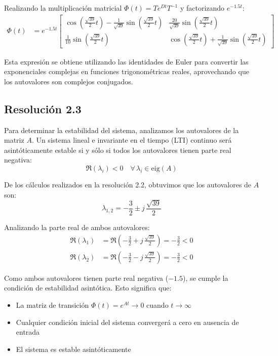 \documentclass[
  11pt,
  letterpaper,
   addpoints,
  answers
  ]{exam}
\begin{document}
\begin{solution}
Realizando la multiplicación matricial $\Phi(t) = T e^{Dt} T^{-1}$ y factorizando $e^{-1.5t}$:
\begin{align}
\Phi(t) &= e^{-1.5t} \begin{bmatrix}
\cos\left(\frac{\sqrt{39}}{2}t\right) - \frac{1}{\sqrt{39}}\sin\left(\frac{\sqrt{39}}{2}t\right) & \frac{20}{\sqrt{39}}\sin\left(\frac{\sqrt{39}}{2}t\right) \\[6pt]
\frac{1}{10}\sin\left(\frac{\sqrt{39}}{2}t\right) & \cos\left(\frac{\sqrt{39}}{2}t\right) + \frac{1}{\sqrt{39}}\sin\left(\frac{\sqrt{39}}{2}t\right)
\end{bmatrix}
\end{align}

Esta expresión se obtiene utilizando las identidades de Euler para convertir las exponenciales complejas en funciones trigonométricas reales, aprovechando que los autovalores son complejos conjugados.
\subsection*{Resolución 2.3}

Para determinar la estabilidad del sistema, analizamos los autovalores de la matriz $A$. Un sistema lineal e invariante en el tiempo (LTI) continuo será asintóticamente estable si y sólo si todos los autovalores tienen parte real negativa:
\begin{equation}
\Re(\lambda_i) < 0 \quad \forall\,\lambda_i \in \mathrm{eig}(A)
\end{equation}

De los cálculos realizados en la resolución 2.2, obtuvimos que los autovalores de $A$ son:
\begin{equation}
\lambda_{1,2} = -\frac{3}{2} \pm j\,\frac{\sqrt{39}}{2}
\end{equation}

Analizando la parte real de ambos autovalores:
\begin{align}
\Re(\lambda_1) &= \Re\left(-\frac{3}{2} + j\,\frac{\sqrt{39}}{2}\right) = -\frac{3}{2} < 0 \\
\Re(\lambda_2) &= \Re\left(-\frac{3}{2} - j\,\frac{\sqrt{39}}{2}\right) = -\frac{3}{2} < 0
\end{align}

Como ambos autovalores tienen parte real negativa ($-1.5$), se cumple la condición de estabilidad asintótica. Esto significa que:
\begin{itemize}
\item La matriz de transición $\Phi(t) = e^{At} \to 0$ cuando $t \to \infty$
\item Cualquier condición inicial del sistema convergerá a cero en ausencia de entrada
\item El sistema es estable asintóticamente
\end{itemize}


\end{solution}
\end{document}
